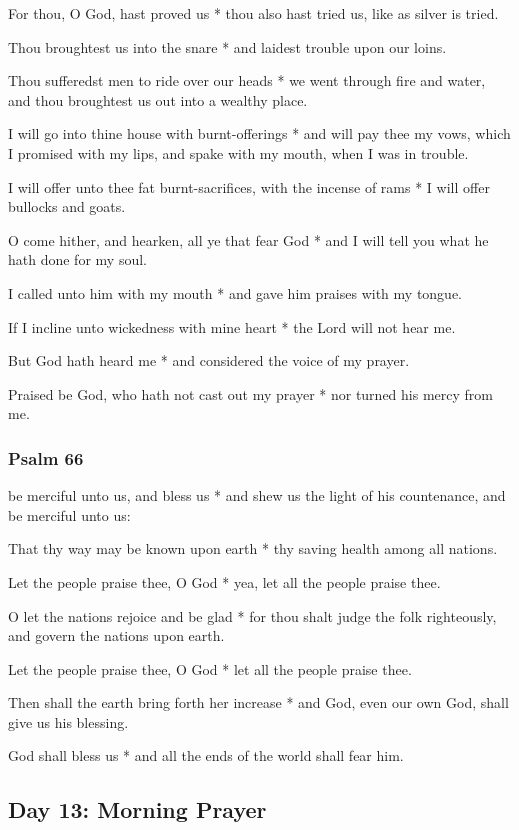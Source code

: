For thou, O God, hast proved us * thou also hast tried us, like as silver is tried.

Thou broughtest us into the snare * and laidest trouble upon our loins.

Thou sufferedst men to ride over our heads * we went through fire and water, and thou broughtest us out into a wealthy place.

I will go into thine house with burnt-offerings * and will pay thee my vows, which I promised with my lips, and spake with my mouth, when I was in trouble.

I will offer unto thee fat burnt-sacrifices, with the incense of rams * I will offer bullocks and goats.

O come hither, and hearken, all ye that fear God * and I will tell you what he hath done for my soul.

I called unto him with my mouth * and gave him praises with my tongue.

If I incline unto wickedness with mine heart * the Lord will not hear me.

But God hath heard me * and considered the voice of my prayer.

Praised be God, who hath not cast out my prayer * nor turned his mercy from me.

\subsubsection{Psalm 66}


 be merciful unto us, and bless us * and shew us the light of his countenance, and be merciful unto us:

That thy way may be known upon earth * thy saving health among all nations.

Let the people praise thee, O God * yea, let all the people praise thee.

O let the nations rejoice and be glad * for thou shalt judge the folk righteously, and govern the nations upon earth.

Let the people praise thee, O God * let all the people praise thee.

Then shall the earth bring forth her increase * and God, even our own God, shall give us his blessing.

God shall bless us * and all the ends of the world shall fear him.

\subsection{Day 13: Morning Prayer}

